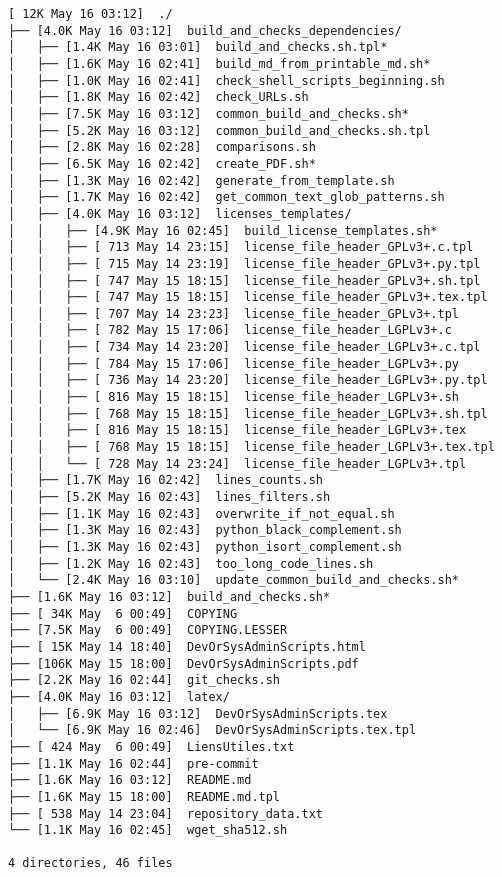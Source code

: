 \documentclass{article}
\begin{document}
\begin{verbatim}
[ 12K May 16 03:12]  ./
├── [4.0K May 16 03:12]  build_and_checks_dependencies/
│   ├── [1.4K May 16 03:01]  build_and_checks.sh.tpl*
│   ├── [1.6K May 16 02:41]  build_md_from_printable_md.sh*
│   ├── [1.0K May 16 02:41]  check_shell_scripts_beginning.sh
│   ├── [1.8K May 16 02:42]  check_URLs.sh
│   ├── [7.5K May 16 03:12]  common_build_and_checks.sh*
│   ├── [5.2K May 16 03:12]  common_build_and_checks.sh.tpl
│   ├── [2.8K May 16 02:28]  comparisons.sh
│   ├── [6.5K May 16 02:42]  create_PDF.sh*
│   ├── [1.3K May 16 02:42]  generate_from_template.sh
│   ├── [1.7K May 16 02:42]  get_common_text_glob_patterns.sh
│   ├── [4.0K May 16 03:12]  licenses_templates/
│   │   ├── [4.9K May 16 02:45]  build_license_templates.sh*
│   │   ├── [ 713 May 14 23:15]  license_file_header_GPLv3+.c.tpl
│   │   ├── [ 715 May 14 23:19]  license_file_header_GPLv3+.py.tpl
│   │   ├── [ 747 May 15 18:15]  license_file_header_GPLv3+.sh.tpl
│   │   ├── [ 747 May 15 18:15]  license_file_header_GPLv3+.tex.tpl
│   │   ├── [ 707 May 14 23:23]  license_file_header_GPLv3+.tpl
│   │   ├── [ 782 May 15 17:06]  license_file_header_LGPLv3+.c
│   │   ├── [ 734 May 14 23:20]  license_file_header_LGPLv3+.c.tpl
│   │   ├── [ 784 May 15 17:06]  license_file_header_LGPLv3+.py
│   │   ├── [ 736 May 14 23:20]  license_file_header_LGPLv3+.py.tpl
│   │   ├── [ 816 May 15 18:15]  license_file_header_LGPLv3+.sh
│   │   ├── [ 768 May 15 18:15]  license_file_header_LGPLv3+.sh.tpl
│   │   ├── [ 816 May 15 18:15]  license_file_header_LGPLv3+.tex
│   │   ├── [ 768 May 15 18:15]  license_file_header_LGPLv3+.tex.tpl
│   │   └── [ 728 May 14 23:24]  license_file_header_LGPLv3+.tpl
│   ├── [1.7K May 16 02:42]  lines_counts.sh
│   ├── [5.2K May 16 02:43]  lines_filters.sh
│   ├── [1.1K May 16 02:43]  overwrite_if_not_equal.sh
│   ├── [1.3K May 16 02:43]  python_black_complement.sh
│   ├── [1.3K May 16 02:43]  python_isort_complement.sh
│   ├── [1.2K May 16 02:43]  too_long_code_lines.sh
│   └── [2.4K May 16 03:10]  update_common_build_and_checks.sh*
├── [1.6K May 16 03:12]  build_and_checks.sh*
├── [ 34K May  6 00:49]  COPYING
├── [7.5K May  6 00:49]  COPYING.LESSER
├── [ 15K May 14 18:40]  DevOrSysAdminScripts.html
├── [106K May 15 18:00]  DevOrSysAdminScripts.pdf
├── [2.2K May 16 02:44]  git_checks.sh
├── [4.0K May 16 03:12]  latex/
│   ├── [6.9K May 16 03:12]  DevOrSysAdminScripts.tex
│   └── [6.9K May 16 02:46]  DevOrSysAdminScripts.tex.tpl
├── [ 424 May  6 00:49]  LiensUtiles.txt
├── [1.1K May 16 02:44]  pre-commit
├── [1.6K May 16 03:12]  README.md
├── [1.6K May 15 18:00]  README.md.tpl
├── [ 538 May 14 23:04]  repository_data.txt
└── [1.1K May 16 02:45]  wget_sha512.sh

4 directories, 46 files
\end{verbatim}
\end{document}
